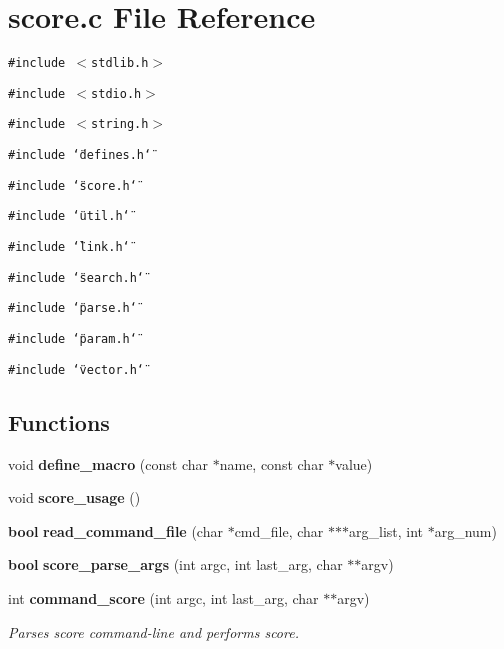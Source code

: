 \section{score.c File Reference}
\label{score_8c}
{\tt \#include $<$stdlib.h$>$}\par
{\tt \#include $<$stdio.h$>$}\par
{\tt \#include $<$string.h$>$}\par
{\tt \#include \char`\"{}defines.h\char`\"{}}\par
{\tt \#include \char`\"{}score.h\char`\"{}}\par
{\tt \#include \char`\"{}util.h\char`\"{}}\par
{\tt \#include \char`\"{}link.h\char`\"{}}\par
{\tt \#include \char`\"{}search.h\char`\"{}}\par
{\tt \#include \char`\"{}parse.h\char`\"{}}\par
{\tt \#include \char`\"{}param.h\char`\"{}}\par
{\tt \#include \char`\"{}vector.h\char`\"{}}\par
\subsection*{Functions}
\begin{CompactItemize}
\item 
void {\bf define\_\-macro} (const char $\ast$name, const char $\ast$value)
\item 
void {\bf score\_\-usage} ()
\item 
{\bf bool} {\bf read\_\-command\_\-file} (char $\ast$cmd\_\-file, char $\ast$$\ast$$\ast$arg\_\-list, int $\ast$arg\_\-num)
\item 
{\bf bool} {\bf score\_\-parse\_\-args} (int argc, int last\_\-arg, char $\ast$$\ast$argv)
\item 
int {\bf command\_\-score} (int argc, int last\_\-arg, char $\ast$$\ast$argv)
\begin{CompactList}\small\item\em Parses score command-line and performs score.\item\end{CompactList}\end{CompactItemize}
